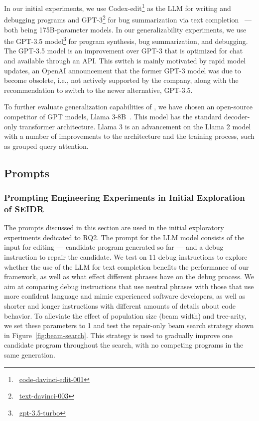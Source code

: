 In our initial experiments, we use Codex-edit\footnote{~\href{https://openai.com/index/gpt-3-edit-insert/}{code-davinci-edit-001}} 
as the LLM for writing and debugging programs and GPT-3\footnote{~\href{https://platform.openai.com/docs/deprecations}{text-davinci-003}} for bug summarization via text completion~\cite{brown2020:language} --- both being 175B-parameter models.
In our generalizability experiments, we use the GPT-3.5 model\footnote{~\href{https://platform.openai.com/docs/models/gpt-3-5-turbo}{gpt-3.5-turbo}} for program synthesis, bug summarization, and debugging. 
The GPT-3.5 model is an improvement over GPT-3 that is optimized for chat and available through an API.
This switch is mainly motivated by rapid model updates, an OpenAI announcement that the former GPT-3 model was due to become obsolete, i.e., not actively supported by the company, along with the recommendation to switch to the newer alternative, GPT-3.5. 

To further evaluate generalization capabilities of \method{}, we have chosen an open-source competitor of GPT models, Llama 3-8B~\cite{roziere2023:code}. 
This model has the standard decoder-only transformer architecture. 
Llama 3 is an advancement on the Llama 2 model~\cite{touvron2023:llama} with a number of improvements to the architecture and the training process, such as grouped query attention.

\subsection{Prompts}
\label{sec:seidr-prompts}


\subsubsection{Prompting Engineering Experiments in Initial Exploration of SEIDR}
\label{sec:seidr-prompt-strategies}

The prompts discussed in this section are used in the initial exploratory experiments dedicated to RQ2. 
The prompt for the LLM model consists of the input for editing --- candidate program generated so far --- and a debug instruction to repair the candidate. 
We test \method{} on 11 debug instructions to explore whether the use of the LLM for text completion benefits the performance of our framework, as well as what effect different phrases have on the debug process. 
We aim at comparing debug instructions that use neutral phrases with those that use more confident language and mimic experienced software developers, as well as shorter and longer instructions with different amounts of details about code behavior.
To alleviate the effect of population size (beam width) and tree-arity, we set these parameters to 1 and test the repair-only beam search strategy shown in Figure~\ref{fig:beam-search}. 
This strategy is used to gradually improve one candidate program throughout the search, with no competing programs in the same generation. 

